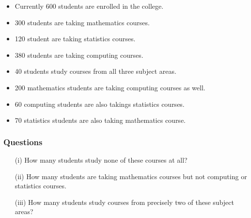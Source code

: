 \documentclass{beamer}
\begin{document}
\begin{frame}
\Large
\begin{itemize}
\item Currently 600
students are enrolled in the college. 
\item 300 students are taking mathematics courses.
\item 120 student are taking statistics courses.
\item 380 students are taking computing courses. 
\end{itemize}
\end{frame}
\begin{frame}
\Large
\begin{itemize}
\item 40 students study courses from all three subject
areas. 
\item 200 mathematics students are taking computing courses as well. \item 60 computing students
are also takings statistics courses. \item  70 statistics students are also taking mathematics course.
\end{itemize}
\end{frame}
\begin{frame}

\frametitle{Questions}
\Large
\begin{itemize}
\item[(i)] How many students study none of these courses at all?
\item[(ii)] How many students are taking mathematics courses but not computing or statistics courses.
\item[(iii)] How many students study courses from precisely two of these subject
areas?

\end{itemize}

\end{frame}
\end{document}
